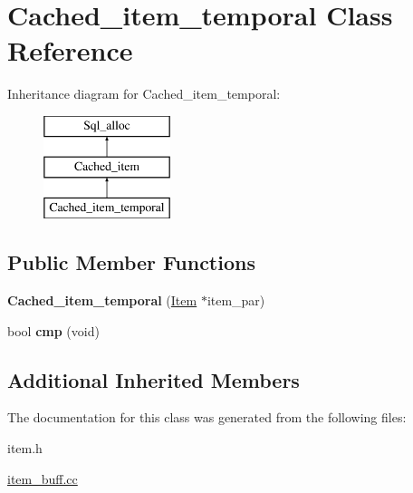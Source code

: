 \hypertarget{classCached__item__temporal}{}\section{Cached\+\_\+item\+\_\+temporal Class Reference}
\label{classCached__item__temporal}
Inheritance diagram for Cached\+\_\+item\+\_\+temporal\+:\begin{figure}[H]
\begin{center}
\leavevmode
\includegraphics[height=3.000000cm]{classCached__item__temporal}
\end{center}
\end{figure}
\subsection*{Public Member Functions}
\begin{DoxyCompactItemize}
\item 
\mbox{\label{classCached__item__temporal_ab3570dc549829d5fce215e72af8a0943}} 
{\bfseries Cached\+\_\+item\+\_\+temporal} (\mbox{\hyperlink{classItem}{Item}} $\ast$item\+\_\+par)
\item 
\mbox{\label{classCached__item__temporal_a395bc764564d0f478816947feaa0f8ee}} 
bool {\bfseries cmp} (void)
\end{DoxyCompactItemize}
\subsection*{Additional Inherited Members}


The documentation for this class was generated from the following files\+:\begin{DoxyCompactItemize}
\item 
item.\+h\item 
\mbox{\hyperlink{item__buff_8cc}{item\+\_\+buff.\+cc}}\end{DoxyCompactItemize}
